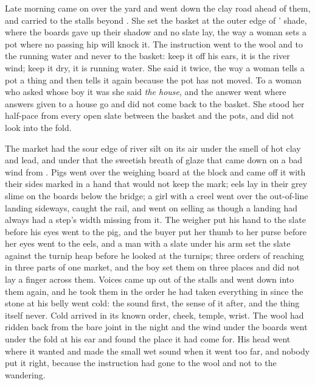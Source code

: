Late morning came on over the yard and went down the clay road ahead of them, and  carried  to the stalls beyond . She set the basket at the outer edge of ' shade, where the boards gave up their shadow and no slate lay, the way a woman sets a pot where no passing hip will knock it. The instruction went to the wool and to the running water and never to the basket: keep it off his ears, it is the river wind; keep it dry, it is running water. She said it twice, the way a woman tells a pot a thing and then tells it again because the pot has not moved. To a woman who asked whose boy it was she said \emph{the house}, and the answer went where answers given to a house go and did not come back to the basket. She stood her half-pace from every open slate between the basket and the pots, and did not look into the fold.

The market had the sour edge of river silt on its air under the smell of hot clay and lead, and under that the sweetish breath of glaze that came down on a bad wind from . Pigs went over the weighing board at the block and came off it with their sides marked in a hand that would not keep the mark; eels lay in their grey slime on the boards below the bridge; a girl with a creel went over the out-of-line landing sideways, caught the rail, and went on selling as though a landing had always had a step's width missing from it. The weigher put his hand to the slate before his eyes went to the pig, and the buyer put her thumb to her purse before her eyes went to the eels, and a man with a slate under his arm set the slate against the turnip heap before he looked at the turnips; three orders of reaching in three parts of one market, and the boy set them on three places and did not lay a finger across them. Voices came up out of the stalls and went down into them again, and he took them in the order he had taken everything in since the stone at his belly went cold: the sound first, the sense of it after, and the thing itself never. Cold arrived in its known order, cheek, temple, wrist. The wool had ridden back from the bare joint in the night and the wind under the boards went under the fold at his ear and found the place it had come for. His head went where it wanted and made the small wet sound when it went too far, and nobody put it right, because the instruction had gone to the wool and not to the wandering.


